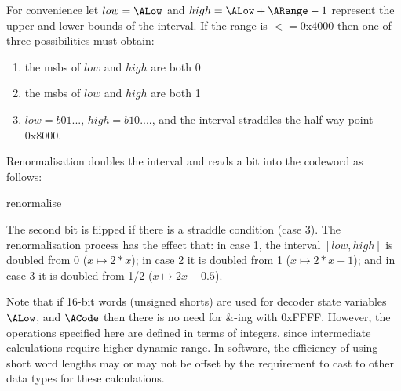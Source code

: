 For convenience let $low=\ALow$ and $high=\ALow+\ARange-1$ 
represent the upper and lower bounds of the interval. If the
range is $<=\text{0x4000}$ then
one of three possibilities must obtain:
\begin{enumerate}
\item the msbs of $low$ and $high$ are both 0
\item the msbs of $low$ and $high$ are both 1
\item $low=b01...$, $high=b10....$,  and the interval straddles the half-way point 0x8000. 
\end{enumerate}

Renormalisation doubles the interval and reads a bit into the codeword
as follows:

\begin{pseudo}{renormalise}{}
\bsEND
{}
\end{pseudo}

The second bit is flipped if there is a straddle condition (case 3). The renormalisation
process has the effect that: in case 1, the interval $[low,high]$ is doubled from 0 ($x\mapsto 2*x$); 
in case 2 it is doubled from 1 ($x\mapsto 2*x-1$); and in case 3 it is doubled from 1/2 ($x\mapsto 2x-0.5$).
 
\begin{informative}
Note that if 16-bit words (unsigned shorts) are used for decoder state variables $\ALow$,
 and $\ACode$ then there is no need for {\&}-ing with 0xFFFF. However, the 
operations specified here are defined in terms of integers, since intermediate calculations
 require higher dynamic range. In software, the efficiency of using short word lengths may
or may not be offset by the requirement to cast to other data types for these calculations.
\end{informative}

